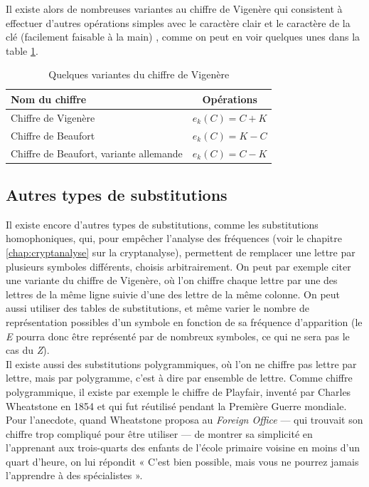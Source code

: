 Il existe alors de nombreuses variantes au chiffre de Vigenère qui
consistent à effectuer d'autres opérations simples avec le caractère
clair et le caractère de la clé (facilement faisable à la main) ,
comme on peut en voir quelques unes dans la table \ref{tab:VariantesVigenere}. 
\begin{table}[h]
  \caption{Quelques variantes du chiffre de Vigenère}
  \label{tab:VariantesVigenere}
  \begin{center}
    \begin{tabular}{|l|c|}
      \hline
      \textbf{Nom du chiffre} & \textbf{Opérations} \\
      \hline
      Chiffre de Vigenère & $e_k(C) = C + K$ \\ 
      \hline
      Chiffre de Beaufort & $e_k(C) = K - C$ \\
      \hline
      Chiffre de Beaufort, variante allemande & $e_k(C) = C - K$ \\
      \hline
    \end{tabular}
  \end{center}
\end{table}

\subsection{Autres types de substitutions\label{sec:SubstitutionsPolygrammiques}}
Il existe encore d'autres types de substitutions, comme les
substitutions homophoniques, qui, pour empêcher l'analyse des
fréquences (voir le chapitre \ref{chap:cryptanalyse} sur la
cryptanalyse), permettent de remplacer une lettre par plusieurs
symboles différents, choisis arbitrairement. On peut par exemple citer
une variante du chiffre de Vigenère, où l'on chiffre chaque lettre par
une des lettres de la même ligne suivie d'une des lettre de la même
colonne. On peut aussi utiliser des tables de substitutions, et même
varier le nombre de représentation possibles d'un symbole en fonction
de sa fréquence d'apparition (le \emph{E} pourra donc être représenté par
de nombreux symboles, ce qui ne sera pas le cas du \emph{Z}).\\

Il existe aussi des substitutions polygrammiques, où l'on ne chiffre
pas lettre par lettre, mais par polygramme, c'est à dire par ensemble
de lettre. Comme chiffre polygrammique, il existe par exemple le
chiffre de Playfair, inventé par Charles Wheatstone en 1854 et qui fut
réutilisé pendant la Première Guerre mondiale. Pour l'anecdote,
quand Wheatstone proposa au \emph{Foreign Office} --- qui trouvait son chiffre
trop compliqué pour être utiliser --- de montrer sa simplicité en
l'apprenant aux trois-quarts des enfants de l'école primaire voisine
en moins d'un quart d'heure, on lui répondit « C'est bien possible,
mais vous ne pourrez jamais l'apprendre à des spécialistes ».

